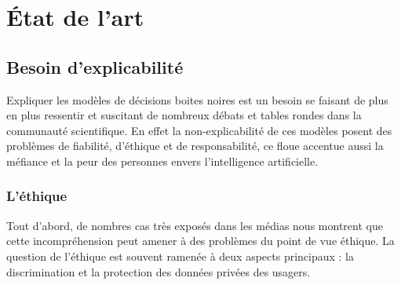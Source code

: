 \chapter{État de l’art}
\section{Besoin d'explicabilité}
Expliquer les modèles de décisions boites noires est un besoin se faisant de plus en plus ressentir et suscitant de nombreux débats et tables rondes dans la communauté scientifique. En effet la non-explicabilité de ces modèles posent des problèmes de fiabilité, d'éthique et de responsabilité, ce floue accentue aussi la méfiance et la peur des personnes envers l'intelligence artificielle.\par
\subsection{L'éthique}
Tout d'abord, de nombres cas très exposés dans les médias nous montrent que cette incompréhension peut amener à des problèmes du point de vue éthique. La question de l'éthique est souvent ramenée à deux aspects principaux : la discrimination et la protection des données privées des usagers.
